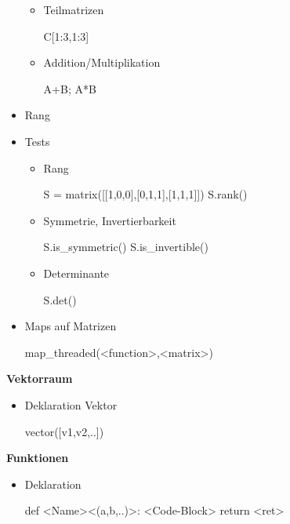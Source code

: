 \documentclass[a4paper,9pt,DIV15,twocolumn]{scrartcl}
\begin{document}
\begin{itemize}
\begin{itemize}
\begin{sagein}
\end{sagein}
\item Teilmatrizen
\begin{sagein}
C[1:3,1:3]
\end{sagein}
\item Addition/Multiplikation
\begin{sagein}
A+B; A*B
\end{sagein}
\end{itemize}
\item Rang
\item Tests
\begin{itemize}
 \item Rang 
\begin{sagein}
S = matrix([[1,0,0],[0,1,1],[1,1,1]])
S.rank()
\end{sagein}
\item Symmetrie, Invertierbarkeit
\begin{sagein}
S.is_symmetric() 
S.is_invertible()
\end{sagein}
\item Determinante
\begin{sagein}
S.det()
\end{sagein}
\end{itemize}
\item Maps auf Matrizen
\begin{sagein}
map_threaded(<function>,<matrix>)
\end{sagein}
\end{itemize}

\textbf{Vektorraum}

\begin{itemize}
 \item Deklaration Vektor
\begin{sagein}
vector([v1,v2,..]) 
\end{sagein}

\end{itemize}

\textbf{Funktionen}

\begin{itemize}
 \item Deklaration
\begin{sagein}
def <Name><(a,b,..)>:
    <Code-Block>
    return <ret>
\end{sagein}
\end{itemize}
\end{document}
